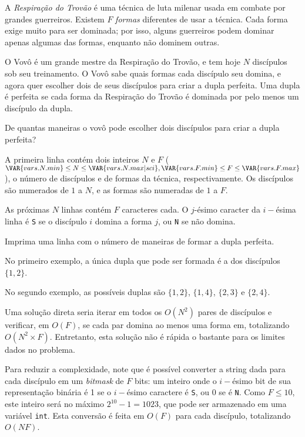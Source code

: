 A \textit{Respiração do Trovão} é uma técnica de luta milenar usada em combate
por grandes guerreiros. Existem $F$ \textit{formas} diferentes de usar a técnica. Cada
forma exige muito para ser dominada; por isso, alguns guerreiros
podem dominar apenas algumas das formas, enquanto não dominem outras.

O Vovô é um grande mestre da Respiração do Trovão, e tem hoje $N$ discípulos sob
seu treinamento. O Vovô sabe quais formas cada discípulo seu domina, e agora quer escolher dois de seus discípulos para criar a dupla perfeita. Uma dupla é perfeita se cada forma da Respiração do Trovão é dominada por
pelo menos um discípulo da dupla.

De quantas maneiras o vovô pode escolher dois discípulos para criar a dupla
perfeita?


A primeira linha contém dois inteiros $N$ e $F$ ($\VAR{vars.N.min} \leq N \leq
\VAR{vars.N.max |sci}, \VAR{vars.F.min} \leq F \leq \VAR{vars.F.max}$),
o número de discípulos e de formas da técnica, respectivamente.
Os discípulos são numerados de $1$ a $N$, e as formas são numeradas de $1$ a
$F$.

As próximas $N$ linhas contém $F$ caracteres cada. O $j$-ésimo caracter da
$i-$ésima linha é \texttt{S} se o discípulo $i$ domina a forma $j$, ou
\texttt{N} se não domina.


Imprima uma linha com o número de maneiras de
formar a dupla perfeita.

No primeiro exemplo, a única dupla que pode ser formada é a dos discípulos
$\{1,2\}$.

No segundo exemplo, as possíveis duplas são
$\{1,2\}$, $\{1,4\}$, $\{2,3\}$ e $\{2,4\}$.


Uma solução direta seria iterar em todos os $O(N^2)$ pares de discípulos e
verificar, em $O(F)$, se cada par domina ao menos uma forma em, totalizando $O(N^2 \times F)$.
Entretanto, esta solução não é rápida o bastante para os limites dados no problema.

Para reduzir a complexidade, note que é possível converter a string dada para
cada discípulo em um \textit{bitmask} de $F$ bits: um inteiro onde o $i-$ésimo
bit de sua representação binária é 1 se o $i-$ésimo caractere é \texttt{S}, ou 0
se é \texttt{N}. Como $F \leq 10$, este inteiro será no máximo $2^{10} - 1 =
1023$, que pode ser armazenado em uma variável \texttt{int}. Esta conversão
é feita em $O(F)$ para cada discípulo, totalizando $O(NF)$.

